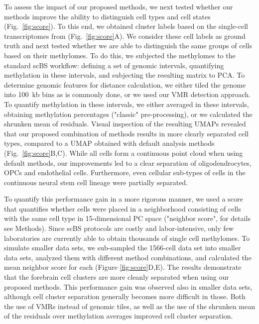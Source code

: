\documentclass[twocolumn,10pt]{article}
\begin{document}
To assess the impact of our proposed methods, we next tested whether our methods improve the ability to distinguish cell types and cell states (Fig.~\ref{fig:score}).
To this end, we obtained cluster labels based on the single-cell transcriptomes from \citet{kremer_scnmt} (Fig.~\ref{fig:score}A).
We consider these cell labels as ground truth and next tested whether we are able to distinguish the same groups of cells based on their methylomes.
To do this, we subjected the methylomes to the standard scBS workflow:
defining a set of genomic intervals, quantifying methylation in these intervals, and subjecting the resulting matrix to PCA.
To determine genomic features for distance calculation, we either tiled the genome into 100~kb bins as is commonly done, or we used our VMR detection approach.
To quantify methylation in these intervals, we either averaged in these intervals, obtaining methylation percentages ("classic" pre-processing), or we calculated the shrunken mean of residuals.
Visual inspection of the resulting UMAPs revealed that our proposed combination of methods results in more clearly separated cell types, compared to a UMAP obtained with default analysis methods (Fig.~\ref{fig:score}B,C).
While all cells form a continuous point cloud when using default methods, our improvements led to a clear separation of oligodendrocytes, OPCs and endothelial cells.
Furthermore, even cellular sub-types of cells in the continuous neural stem cell lineage were partially separated.

To quantify this performance gain in a more rigorous manner, we used a score that quantifies whether cells were placed in a neighborhood consisting of cells with the same cell type in 15-dimensional PC space ("neighbor score", for details see Methods).
Since scBS protocols are costly and labor-intensive, only few laboratories are currently able to obtain thousands of single cell methylomes.
To simulate smaller data sets, we sub-sampled the 1566-cell data set into smaller data sets, analyzed them with different method combinations, and calculated the mean neighbor score for each (Figure \ref{fig:score}D,E).
The results demonstrate that the forebrain cell clusters are more cleanly separated when using our proposed methods.
This performance gain was observed also in smaller data sets, although cell cluster separation generally becomes more difficult in those.
Both the use of VMRs instead of genomic tiles, as well as the use of the shrunken mean of the residuals over methylation averages improved cell cluster separation.
\end{document}
